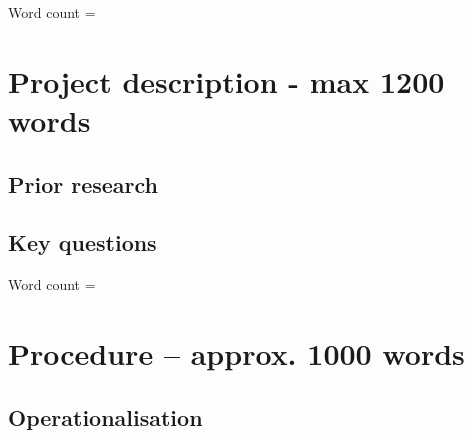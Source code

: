 \documentclass[12pt,a4paper]{article}
\begin{document}
Word count = 

\section{Project description \textmd{- max 1200 words}}
\subsection{Prior research}
%

\cite{barrett2006}

\subsection{Key questions}


Word count = 

\section{Procedure \textmd{– approx. 1000 words}}
\subsection{Operationalisation}
\end{document}
